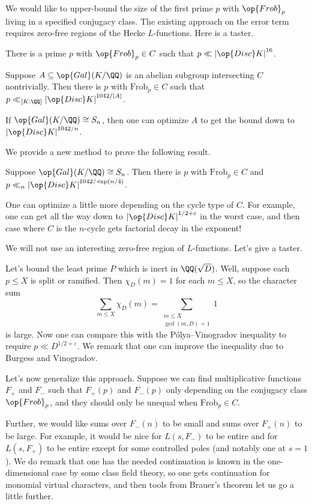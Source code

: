 \documentclass{article}
\begin{document}
We would like to upper-bound the size of the first prime $p$ with $\op{Frob}_p$ living in a specified conjugacy class. The existing approach on the error term requires zero-free regions of the Hecke $L$-functions. Here is a taster.
\begin{theorem}
	There is a prime $p$ with ${\op{Frob}_p}\in C$ such that $p\ll\left|\op{Disc}K\right|^{16}$.
\end{theorem}
\begin{theorem}
	Suppose $A\subseteq\op{Gal}(K/\QQ)$ is an abelian subgroup intersecting $C$ nontrivially. Then there is $p$ with $\mathrm{Frob}_p\in C$ such that $p\ll_{[K:\QQ]}\left|\op{Disc}K\right|^{1042/\left|A\right|}$.
\end{theorem}
\begin{example}
	If $\op{Gal}(K/\QQ)\cong S_n$, then one can optimize $A$ to get the bound down to $\left|\op{Disc}K\right|^{1042/n}$.
\end{example}
We provide a new method to prove the following result.
\begin{theorem}
	Suppose $\op{Gal}(K/\QQ)\cong S_n$. Then there is $p$ with $\mathrm{Frob}_p\in C$ and $p\ll_n\left|\op{Disc}K\right|^{1042/\exp(n/4)}$.
\end{theorem}
One can optimize a little more depending on the cycle type of $C$. For example, one can get all the way down to $\left|\op{Disc}K\right|^{1/2+\varepsilon}$ in the worst case, and then case where $C$ is the $n$-cycle gets factorial decay in the exponent!

We will not use an interesting zero-free region of $L$-functions. Let's give a taster.
\begin{example}
	Let's bound the least prime $P$ which is inert in $\QQ(\sqrt D)$. Well, suppose each $p\le X$ is split or ramified. Then $\chi_D(m)=1$ for each $m\le X$, so the character sum
	\[\sum_{m\le X}\chi_D(m)=\sum_{\substack{m\le X\\\gcd(m,D)=1}}1\]
	is large. Now one can compare this with the P\'olya--Vinogradov inequality to require $p\ll D^{1/2+\varepsilon}$. We remark that one can improve the inequality due to Burgess and Vinogradov.
\end{example}
Let's now generalize this approach. Suppose we can find multiplicative functions $F_+$ and $F_-$ such that $F_+(p)$ and $F_-(p)$ only depending on the conjugacy class $\op{Frob}_p$, and they should only be unequal when $\mathrm{Frob}_p\in C$.

Further, we would like sums over $F_-(n)$ to be small and sums over $F_+(n)$ to be large. For example, it would be nice for $L(s,F_-)$ to be entire and for $L(s,F_+)$ to be entire except for some controlled poles (and notably one at $s=1$). We do remark that one has the needed continuation is known in the one-dimensional case by some class field theory, so one gets continuation for monomial virtual characters, and then tools from Brauer's theorem let us go a little further.
\end{document}
